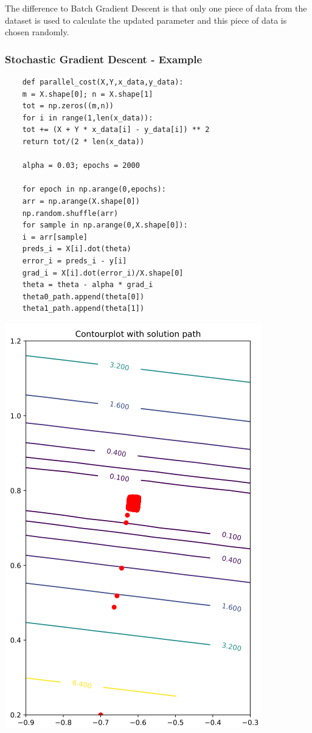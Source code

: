 \documentclass[11pt]{article}
\begin{document}
The difference to Batch Gradient Descent is that only one piece of data from the dataset is used to calculate the updated parameter and this piece of data is chosen randomly.

\subsubsection{Stochastic Gradient Descent - Example}

\begin{minipage}{0.55\textwidth}
    \begin{lstlisting}
    def parallel_cost(X,Y,x_data,y_data):
    m = X.shape[0]; n = X.shape[1]
    tot = np.zeros((m,n))
    for i in range(1,len(x_data)):
    tot += (X + Y * x_data[i] - y_data[i]) ** 2
    return tot/(2 * len(x_data))

    alpha = 0.03; epochs = 2000

    for epoch in np.arange(0,epochs):
    arr = np.arange(X.shape[0])
    np.random.shuffle(arr)
    for sample in np.arange(0,X.shape[0]):
    i = arr[sample]
    preds_i = X[i].dot(theta)
    error_i = preds_i - y[i]
    grad_i = X[i].dot(error_i)/X.shape[0]
    theta = theta - alpha * grad_i
    theta0_path.append(theta[0])
    theta1_path.append(theta[1])
            \end{lstlisting}
\end{minipage}
\hfill
\begin{minipage}{0.4\textwidth}
    \centering
    \includegraphics[keepaspectratio, height=\linewidth]{Pictures/stochastic_gradient_descent}
    \label{fig:stochasticgradientdescent}
\end{minipage}
\end{document}
